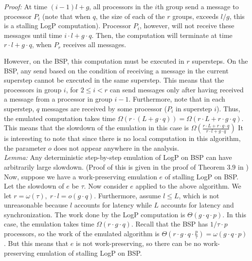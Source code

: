 \documentclass[12pt,a4paper]{article}
\begin{document}
\noindent \emph{Proof:} At time $(i-1)l + g$, all processors in the $i$th group send a message to processor $P_i$ (note that when $q$, the size of
each of the $r$ groups, exceeds $l/g$, this is a stalling LogP computation). Processor $P_i$, however, will not receive these messages until time $i
\cdot l + g \cdot q$. Then, the computation will terminate at time $r \cdot l + g \cdot q$, when $P_r$ receives all messages. 

\noindent However, on the BSP, this computation must be executed in $r$ supersteps. On the BSP, any send based on the condition of receiving a
message in the current superstep cannot be executed in the same superstep. This means that the processors in group $i$, for $2 \leq i < r$ can send
messages only after having received a message from a processor in group $i-1$. Furthermore, note that in each superstep, $q$ messages are received
by some processor ($P_i$ in superstep $i$). Thus, the emulated computation takes time $\Omega(r \cdot (L + g \cdot q)) = \Omega(r \cdot L + r \cdot
g \cdot q)$. This means that the slowdown of the emulation in this case is $\Omega(\frac{r \cdot L + r \cdot g \cdot q}{r \cdot l + g \cdot q})$ It
is interesting to note that since there is no local computation in this algorithm, the parameter $o$ does not appear anywhere in the analysis. \\

\noindent \emph{Lemma:} Any deterministic step-by-step emulation of LogP on BSP can have arbitrarily large slowdown. (Proof of this is given in the
proof of Theorem $3.9$ in \cite{Vlr03}) \\

\noindent Now, suppose we have a work-preserving emulation $e$ of stalling LogP on BSP. Let the slowdown of $e$ be $\tau$. Now consider 
$e$ applied to the above algorithm. We let $r = \omega(\tau), \; r \cdot l = o(g \cdot q)$. Furthermore, assume $l \leq L$, which is not
unreasonable because $l$ accounts for latency while $L$ accounts for latency and synchronization.
The work done by the LogP computation is $\Theta(g \cdot q \cdot p)$.
In this case, the emulation takes time $\Omega(r \cdot g \cdot q)$. Recall that the BSP has $1/\tau \cdot p$ processors, so the work of the emulated
algorithm is $\Theta(r \cdot g \cdot q \cdot \frac{p}{\tau}) = \omega(g \cdot q \cdot p)$. But this means that $e$ is not work-preserving, so there
can be no work-preserving emulation of stalling LogP on BSP.
\end{document}

